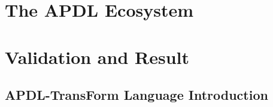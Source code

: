 \documentclass{hessothesis}
\begin{document}
\maketitle
\makeinfopage

\tableofcontents







\part{The APDL Ecosystem}






\part{Validation and Result}




\printbibliography
\printglossaries
\listoftables
\listoffigures
\listoflistings

\begin{appendices}
  
\chapter{APDL-TransForm Language Introduction}
\label{app:tf-getting-started}

\end{appendices}
\end{document}

